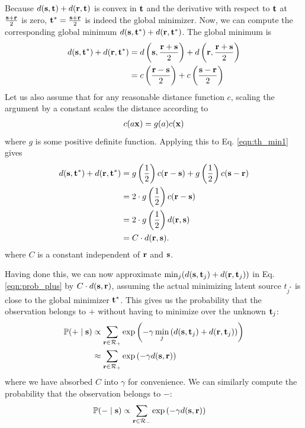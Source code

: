Because $d(\mathbf s, \mathbf t) + d(\mathbf r, \mathbf t)$ is convex in $\mathbf t$ and the
derivative with respect to $\mathbf t$ at $\frac{\mathbf s + \mathbf r}{2}$ is zero, $\mathbf
t^* = \frac{\mathbf s + \mathbf r}{2}$ is indeed the global minimizer. Now, we can
compute the corresponding global minimum $d(\mathbf s,\mathbf t^*) + d(\mathbf r,\mathbf
t^*)$. The global minimum is
\begin{align}
d(\mathbf s,\mathbf t^*) + d(\mathbf r,\mathbf t^*) &= d\left(\mathbf s,\frac{\mathbf r + \mathbf s}{2}\right) + d\left(\mathbf r,\frac{\mathbf r + \mathbf s}{2}\right)\notag\\
&= c\left(\frac{\mathbf r - \mathbf s}{2}\right) + c\left(\frac{\mathbf s - \mathbf r}{2}\right) \label{eqn:th_min1}
\end{align}
Let us also assume that for any reasonable distance function $c$, scaling the
argument by a constant scales the distance according to
\begin{gather}
c(a\mathbf x) = g(a)c(\mathbf x)
\end{gather}
where $g$ is some positive definite function. Applying this to Eq. \ref{eqn:th_min1} gives
\begin{align}
d(\mathbf s,\mathbf t^*) + d(\mathbf r,\mathbf t^*) &= g\left(\frac{1}{2}\right) c(\mathbf r - \mathbf s) +  g\left(\frac{1}{2}\right) c(\mathbf s - \mathbf r)\notag\\
&= 2 \cdot g\left(\frac{1}{2}\right) c(\mathbf r - \mathbf s)\notag\\
&= 2 \cdot g\left(\frac{1}{2}\right) d(\mathbf r, \mathbf s)\notag\\
&= C \cdot d(\mathbf r, \mathbf s).
\end{align}
where $C$ is a constant independent of $\mathbf r$ and $\mathbf s$.

Having done this, we can now approximate $\min_j (d(\mathbf s,\mathbf t_j) + d(\mathbf r,\mathbf
t_j))$ in Eq. \ref{eqn:prob_plus} by $C \cdot d(\mathbf s,\mathbf r)$, assuming the
actual minimizing latent source $t_{j^*}$ is close to the global minimizer
$\mathbf t^*$. This gives us the probability that the observation belongs to $+$ without
having to minimize over the unknown $\mathbf t_j$:
\begin{align}
\mathbb{P}(+ \;|\;\mathbf s) &\propto \sum_{\mathbf r \in \mathcal{R}_+}
\exp{\left(-\gamma \min_{j} \left( d(\mathbf s,\mathbf t_j) + d(\mathbf r,\mathbf t_j) \right) \right)}\notag\\
&\approx \sum_{\mathbf r \in \mathcal{R}_+} \exp
\left(-\gamma d(\mathbf s,\mathbf r)\right) \label{eqn:prob_plus_approx}
\end{align}
where we have absorbed $C$ into $\gamma$ for convenience. We can similarly compute the probability that the observation belongs to $-$:
\begin{align}
\mathbb{P}(- \;|\; \mathbf s ) &\propto \sum_{\mathbf r \in
  \mathcal{R}_-} \exp \left(-\gamma d(\mathbf s,\mathbf
  r)\right) \label{eqn:prob_minus_approx}
\end{align}

